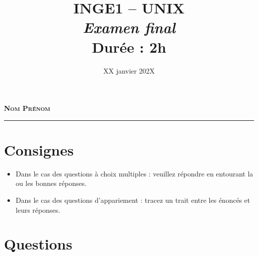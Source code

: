 \documentclass[11pt,a4paper]{article}
\title{\textsc{INGE1 -- UNIX}\\
    \emph{Examen final} \\
    Durée : 2h
}
\date{XX janvier 202X}
\begin{document}
\maketitle

\thispagestyle{empty}
\begin{figure}[!h]
    \centering
\end{figure}

\vfill
{\noindent\Large \textbf{\textsc{Nom Prénom}}}\\[1cm]
\rule{0.8\textwidth}{1pt}

\vfill
\noindent{}
\newpage

\section*{Consignes}
\begin{itemize}
    \item Dans le cas des questions à choix multiples : veuillez répondre en entourant la ou les bonnes réponses. 
    \item Dans le cas des questions d'appariement : tracez un trait entre les énoncés et leurs réponses.
\end{itemize}
\section*{Questions}
\end{document}
